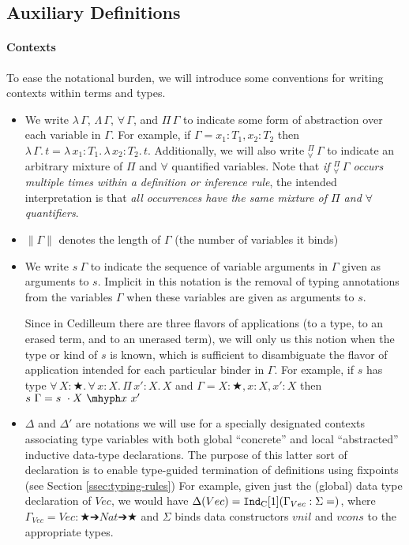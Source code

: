 \documentclass{article}
\newcommand{\ann}[2]{#1\! : \! #2}
\newcommand{\abs}[4]{{#1}\, #2\! : \! #3.\, #4}
\newcommand{\absu}[3]{{#1}\, #2.\, #3}
\newcommand{\indast}[5]{\texttt{Ind}_{#1} [#2] (#3 : #4 = #5)}
\newcommand{\lenc}[1]{\|#1\|}
\newcommand{\piforall}{^{\Pi}_{\forall}}
\begin{document}
\subsection{Auxiliary Definitions}
\label{ssec:inductive-aux-defs}

\paragraph{Contexts}
To ease the notational burden, we will introduce some conventions for writing
contexts within terms and types.

\begin{itemize}
\item We write $\lambda\,\Gamma$, $\Lambda\,\Gamma$, $\forall\,\Gamma$, and
  $\Pi\,\Gamma$ to indicate some form of abstraction over each variable in
  $\Gamma$. For example, if $\Gamma = \ann{x_1}{T_1},\ann{x_2}{T_2}$ then
  $\absu{\lambda}{\Gamma}{t} =
  \abs{\lambda}{x_1}{T_1}{\abs{\lambda}{x_2}{T_2}{t}}$. Additionally, we
  will also write $\piforall\,\Gamma$ to indicate an arbitrary mixture of $\Pi$
  and $\forall$ quantified variables. Note that \textit{if $\piforall\,\Gamma$
  occurs multiple times within a definition or inference rule}, the intended
  interpretation is that \textit{all occurrences have the same mixture of $\Pi$
    and $\forall$ quantifiers}.
\item $\lenc{\Gamma}$ denotes the length of $\Gamma$ (the number of variables it
  binds)
\item We write $s\ \Gamma$ to indicate the sequence of variable arguments in
  $\Gamma$ given as arguments to $s$. Implicit in this notation is the removal
  of typing annotations from the variables $\Gamma$ when these variables are
  given as arguments to $s$.

  Since in Cedilleum there are three flavors of applications (to a type, to an
  erased term, and to an unerased term), we will only us this notion when the type
  or kind of $s$ is known, which is sufficient to disambiguate the flavor of
  application intended for each particular binder in $\Gamma$. For example,
  if $s$ has type
  $\abs{\forall}{X}{★}{\abs{\forall}{x}{X}{\abs{\Pi}{x'}{X}{X}}}$ and $\Gamma =
  \ann{X}{★},\ann{x}{X},\ann{x'}{X}$ then $s\ \Gamma = s\ \cdot X\ \mhyph x\ x'$
\item $\Delta$ and $\Delta'$ are notations we will use
  for a specially designated contexts associating type variables with both global
  ``concrete'' and local ``abstracted'' inductive data-type declarations.
  The purpose of this latter sort of declaration is to enable type-guided
  termination of definitions using fixpoints (see Section \ref{ssec:typing-rules}) For example, given
  just the (global) data type declaration of $Vec$, we would have $\Delta(Vec) =
  \indast{\text{C}}{1}{\Gamma_{Vec}}{\Sigma}$, where $\Gamma_{Vec} = \ann{Vec}{★ ➔ Nat ➔
    ★}$ and  $\Sigma$ binds data constructors $vnil$ and $vcons$ to the
  appropriate types.
\end{itemize}
\end{document}
